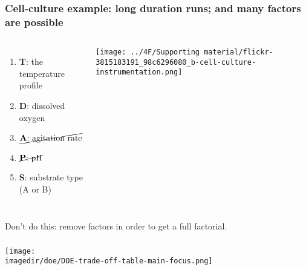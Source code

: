 \documentclass[11pt,aspectratio=169,mathserif]{beamer}
\begin{document}
\begin{frame}\frametitle{Cell-culture example: long duration runs; and many factors are possible}
	\begin{columns}[c]
			\begin{enumerate}
				\item	\textbf{T}: the temperature profile
				\item	\textbf{D}: dissolved oxygen
				\item	$\cancel{\text{\textbf{A}: agitation rate}}$
				\item	$\cancel{\text{\textbf{P}: pH}}$
				\item	\textbf{S}: substrate type (A or B)
			\end{enumerate}
		
			
			\vspace{0.2cm}
			
			\centerline{\texttt{[image: ../4F/Supporting material/flickr-3815183191\_98c6296080\_b-cell-culture-instrumentation.png]}}
	\end{columns}

	\vfill
	{\color{red} Don't do this:} remove factors in order to get a full factorial.
	
\end{frame}

\begin{frame}\frametitle{}
	\centerline{\texttt{[image: \\imagedir/doe/DOE-trade-off-table-main-focus.png]}}
\end{frame}
\end{document}
